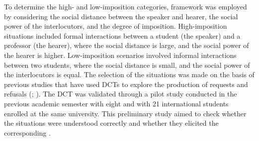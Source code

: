\documentclass[output=paper]{langsci/langscibook}
\begin{document}
\begin{table}
\caption{Description of the situations included in the DCT}
\label{tab:sanchez:2}

\end{table}

To determine the high- and low-imposition categories,  framework was employed by considering the social distance between the speaker and hearer, the social power of the interlocutors, and the degree of imposition. High-imposition situations included formal interactions between a student (the speaker) and a professor (the hearer), where the social distance is large, and the social power of the hearer is higher. Low-imposition scenarios involved informal interactions between two students, where the social distance is small, and the social power of the interlocutors is equal. The selection of the situations was made on the basis of previous studies that have used DCTs to explore the production of requests and refusals (\citealt{Alcón-Soler2008}; \citealt{Taguchi2006,Taguchi2011,Taguchi2013,Martínez-FlorUsó-Juan2011}). The DCT was validated through a pilot study conducted in the previous academic semester with eight  and with 21 international students enrolled at the same university. This preliminary study aimed to check whether the situations were understood correctly and whether they elicited the corresponding . 
\end{document}
